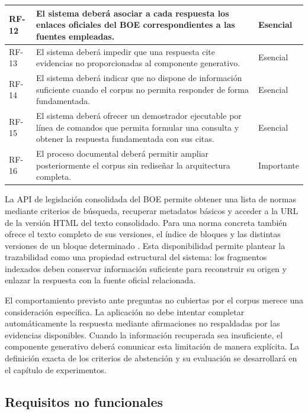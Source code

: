\begin{table}[htbp]
\begin{tabularx}{\textwidth}{|p{1.4cm}|X|p{2.0cm}|}
        \hline
        RF-12 & El sistema deberá asociar a cada respuesta los enlaces oficiales del BOE correspondientes a las fuentes empleadas. & Esencial \\
        \hline
        RF-13 & El sistema deberá impedir que una respuesta cite evidencias no proporcionadas al componente generativo. & Esencial \\
        \hline
        RF-14 & El sistema deberá indicar que no dispone de información suficiente cuando el corpus no permita responder de forma fundamentada. & Esencial \\
        \hline
        RF-15 & El sistema deberá ofrecer un demostrador ejecutable por línea de comandos que permita formular una consulta y obtener la respuesta fundamentada con sus citas. & Esencial \\
        \hline
        RF-16 & El proceso documental deberá permitir ampliar posteriormente el corpus sin rediseñar la arquitectura completa. & Importante \\
        \hline
    \end{tabularx}
\end{table}

La API de legislación consolidada del BOE permite obtener una lista de normas mediante criterios de búsqueda, recuperar metadatos básicos y acceder a la URL de la versión HTML del texto consolidado. Para una norma concreta también ofrece el texto completo de sus versiones, el índice de bloques y las distintas versiones de un bloque determinado \cite{boeApiConsolidada}. Esta disponibilidad permite plantear la trazabilidad como una propiedad estructural del sistema: los fragmentos indexados deben conservar información suficiente para reconstruir su origen y enlazar la respuesta con la fuente oficial relacionada.

El comportamiento previsto ante preguntas no cubiertas por el corpus merece una consideración específica. La aplicación no debe intentar completar automáticamente la respuesta mediante afirmaciones no respaldadas por las evidencias disponibles. Cuando la información recuperada sea insuficiente, el componente generativo deberá comunicar esta limitación de manera explícita. La definición exacta de los criterios de abstención y su evaluación se desarrollará en el capítulo de experimentos.

\subsection{Requisitos no funcionales}
\label{subsec:requisitos-no-funcionales}

